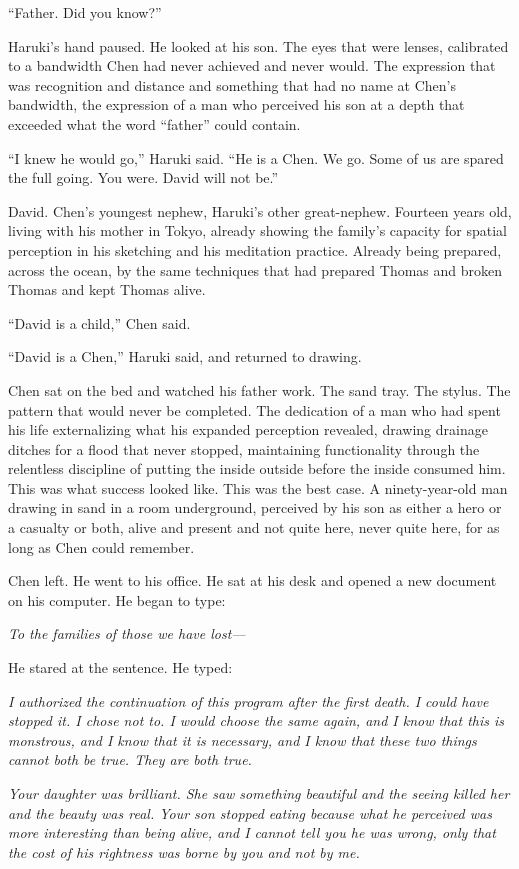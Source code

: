 ``Father. Did you know?''

Haruki's hand paused. He looked at his son. The eyes that were lenses, calibrated to a bandwidth Chen had never achieved and never would. The expression that was recognition and distance and something that had no name at Chen's bandwidth, the expression of a man who perceived his son at a depth that exceeded what the word ``father'' could contain.

``I knew he would go,'' Haruki said. ``He is a Chen. We go. Some of us are spared the full going. You were. David will not be.''

David. Chen's youngest nephew, Haruki's other great-nephew. Fourteen years old, living with his mother in Tokyo, already showing the family's capacity for spatial perception in his sketching and his meditation practice. Already being prepared, across the ocean, by the same techniques that had prepared Thomas and broken Thomas and kept Thomas alive.

``David is a child,'' Chen said.

``David is a Chen,'' Haruki said, and returned to drawing.

Chen sat on the bed and watched his father work. The sand tray. The stylus. The pattern that would never be completed. The dedication of a man who had spent his life externalizing what his expanded perception revealed, drawing drainage ditches for a flood that never stopped, maintaining functionality through the relentless discipline of putting the inside outside before the inside consumed him. This was what success looked like. This was the best case. A ninety-year-old man drawing in sand in a room underground, perceived by his son as either a hero or a casualty or both, alive and present and not quite here, never quite here, for as long as Chen could remember.

Chen left. He went to his office. He sat at his desk and opened a new document on his computer. He began to type:

\textit{To the families of those we have lost---}

He stared at the sentence. He typed:

\textit{I authorized the continuation of this program after the first death. I could have stopped it. I chose not to. I would choose the same again, and I know that this is monstrous, and I know that it is necessary, and I know that these two things cannot both be true. They are both true.}

\textit{Your daughter was brilliant. She saw something beautiful and the seeing killed her and the beauty was real. Your son stopped eating because what he perceived was more interesting than being alive, and I cannot tell you he was wrong, only that the cost of his rightness was borne by you and not by me.}

